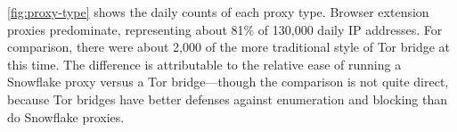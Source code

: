 \documentclass[letterpaper,twocolumn]{article}
\begin{document}
\autoref{fig:proxy-type} shows the daily counts
of each proxy type.
Browser extension proxies predominate,
representing about 81\%
of 130,000 daily IP addresses.
For comparison, there were about 2,000
of the more traditional style of Tor bridge at this time.
The difference is attributable to the relative ease
of running a Snowflake proxy versus a Tor bridge---though
the comparison is not quite direct,
because Tor bridges have better defenses
against enumeration and blocking than do Snowflake proxies.
\end{document}

